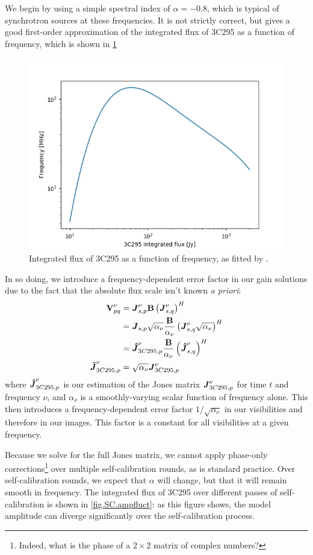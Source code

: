 \pg
We begin by using a simple spectral index of $\alpha=-0.8$, which is typical of synchrotron sources at these frequencies. It is not strictly correct, but gives a good first-order approximation of the integrated flux of 3C295 as a function of frequency, which is shown in \cref{fig.3c295.intflux}
\begin{figure}[h]
\includegraphics[width=0.8\linewidth]{images/3C295-intflux.png}
\caption{\label{fig.3c295.intflux} Integrated flux of 3C295 as a function of frequency, as fitted by .}
\end{figure}

\pg
In so doing, we introduce a frequency-dependent error factor in our gain solutions due to the fact that the absolute flux scale isn't known \textit{a priori}:
\begin{align}
\textbf{V}_{pq}^\nu&=\textbf{\emph{J}}_{s,p}^\nu \textbf{B} \left(\textbf{\emph{J}}_{s,q}^\nu\right)^H\\
         &=\textbf{\emph{J}}_{s,p}\sqrt{\alpha_\nu} \frac{\textbf{B}}{\alpha_\nu} \left(\textbf{\emph{J}}_{s,q}^\nu\sqrt{\alpha_\nu}\right)^H\\
         &=\textbf{\emph{\^{J}}}_{3C295,p}^{\nu}\frac{\textbf{B}}{\alpha_\nu} \left(\textbf{\emph{\^{J}}}_{s,q}^\nu\right)^H\\
\textbf{\emph{\^{J}}}_{3C295,p}^{\nu} &= \sqrt{\alpha_\nu} \textbf{\emph{J}}_{3C295,p}^{\nu}
\end{align}
where $\textbf{\emph{\^{J}}}_{3C295,p}^{\nu}$ is our estimation of the Jones matrix $\textbf{\emph{J}}_{3C295,p}^{\nu}$ for time $t$ and frequency $\nu$, and $\alpha_\nu$ is a smoothly-varying  scalar function of frequency alone. This then introduces a frequency-dependent error factor $1/\sqrt{\alpha_\nu}$ in our visibilities and therefore in our images. This factor is a constant for all visibilities at a given frequency.

\pg
Because we solve for the full Jones matrix, we cannot apply phase-only corrections\footnote{Indeed, what is the phase of a $2\times2$ matrix of complex numbers?} over multiple self-calibration rounds, as is standard practice. Over self-calibration rounds, we expect that $\alpha$ will change, but that it will remain smooth in frequency. The integrated flux of 3C295 over different passes of self-calibration is shown in \cref{fig.SC.ampfluct}: as this figure shows, the model amplitude can diverge significantly over the self-calibration process. %


